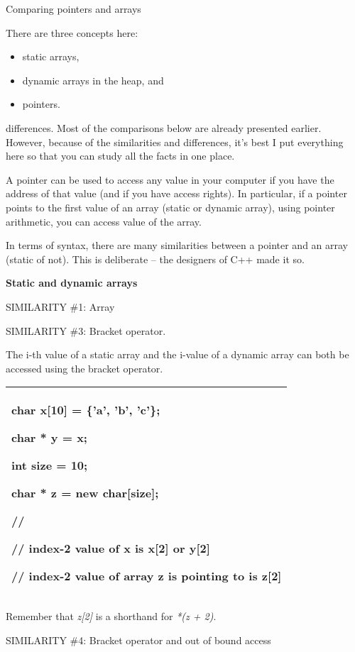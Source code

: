 \documentclass[
]{article}
\providecommand{\tightlist}{%
  \setlength{\itemsep}{0pt}\setlength{\parskip}{0pt}}
\begin{document}
Comparing pointers and arrays

There are three concepts here:

\begin{itemize}
\tightlist
\item
  static arrays,
\item
  dynamic arrays in the heap, and
\item
  pointers.
\end{itemize}

differences. Most of the comparisons below are already presented
earlier. However, because of the similarities and differences, it's best
I put everything here so that you can study all the facts in one place.

A pointer can be used to access any value in your computer if you have
the address of that value (and if you have access rights). In
particular, if a pointer points to the first value of an array (static
or dynamic array), using pointer arithmetic, you can access value of the
array.

In terms of syntax, there are many similarities between a pointer and an
array (static of not). This is deliberate -- the designers of C++ made
it so.

\textbf{Static and dynamic arrays}

SIMILARITY \#1: Array

SIMILARITY \#3: Bracket operator.

The i-th value of a static array and the i-value of a dynamic array can
both be accessed using the bracket operator.

\begin{longtable}[]{@{}l@{}}
\toprule
\endhead
\begin{minipage}[t]{0.97\columnwidth}\raggedright
char x{[}10{]} = \{'a', 'b', 'c'\};

char * y = x;

int size = 10;

char * z = new char{[}size{]};

//

// index-2 value of x is x{[}2{]} or y{[}2{]}

// index-2 value of array z is pointing to is z{[}2{]}\strut
\end{minipage}\tabularnewline
\bottomrule
\end{longtable}

Remember that \emph{z{[}2{]}} is a shorthand for \emph{*(z + 2)}.

SIMILARITY \#4: Bracket operator and out of bound access
\end{document}
